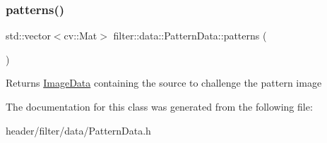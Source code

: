\subsubsection{\texorpdfstring{patterns()}{patterns()}}
{\footnotesize\ttfamily std\+::vector$<$cv\+::\+Mat$>$ filter\+::data\+::\+Pattern\+Data\+::patterns (\begin{DoxyParamCaption}{ }\end{DoxyParamCaption})\hspace{0.3cm}{\ttfamily [inline]}}

\begin{DoxyReturn}{Returns}
\hyperlink{classfilter_1_1data_1_1_image_data}{Image\+Data} containing the source to challenge the pattern image 
\end{DoxyReturn}


The documentation for this class was generated from the following file\+:\begin{DoxyCompactItemize}
\item 
header/filter/data/Pattern\+Data.\+h\end{DoxyCompactItemize}
